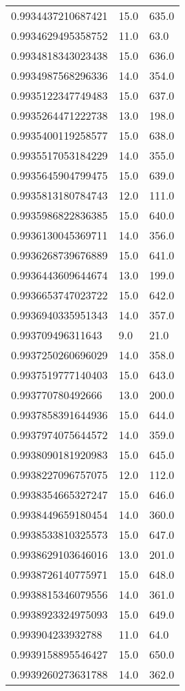 \begin{center}
\begin{supertabular}[H]{p{0.30\textwidth}p{0.05\textwidth}p{0.05\textwidth}}
0.9934437210687421 & 15.0 & 635.0 \\ 
0.9934629495358752 & 11.0 & 63.0 \\ 
0.9934818343023438 & 15.0 & 636.0 \\ 
0.9934987568296336 & 14.0 & 354.0 \\ 
0.9935122347749483 & 15.0 & 637.0 \\ 
0.9935264471222738 & 13.0 & 198.0 \\ 
0.9935400119258577 & 15.0 & 638.0 \\ 
0.9935517053184229 & 14.0 & 355.0 \\ 
0.9935645904799475 & 15.0 & 639.0 \\ 
0.9935813180784743 & 12.0 & 111.0 \\ 
0.9935986822836385 & 15.0 & 640.0 \\ 
0.9936130045369711 & 14.0 & 356.0 \\ 
0.9936268739676889 & 15.0 & 641.0 \\ 
0.9936443609644674 & 13.0 & 199.0 \\ 
0.9936653747023722 & 15.0 & 642.0 \\ 
0.9936940335951343 & 14.0 & 357.0 \\ 
0.993709496311643 & 9.0 & 21.0 \\ 
0.9937250260696029 & 14.0 & 358.0 \\ 
0.9937519777140403 & 15.0 & 643.0 \\ 
0.993770780492666 & 13.0 & 200.0 \\ 
0.9937858391644936 & 15.0 & 644.0 \\ 
0.9937974075644572 & 14.0 & 359.0 \\ 
0.9938090181920983 & 15.0 & 645.0 \\ 
0.9938227096757075 & 12.0 & 112.0 \\ 
0.9938354665327247 & 15.0 & 646.0 \\ 
0.9938449659180454 & 14.0 & 360.0 \\ 
0.9938533810325573 & 15.0 & 647.0 \\ 
0.9938629103646016 & 13.0 & 201.0 \\ 
0.9938726140775971 & 15.0 & 648.0 \\ 
0.9938815346079556 & 14.0 & 361.0 \\ 
0.9938923324975093 & 15.0 & 649.0 \\ 
0.993904233932788 & 11.0 & 64.0 \\ 
0.9939158895546427 & 15.0 & 650.0 \\ 
0.9939260273631788 & 14.0 & 362.0 \\ 

\end{supertabular}
\end{center}
